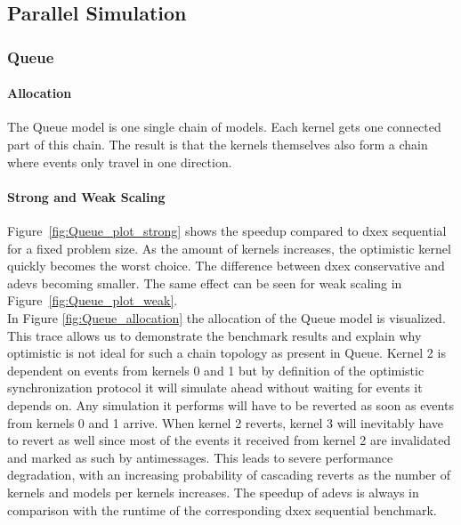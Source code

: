 \subsection{Parallel Simulation}

\subsubsection{Queue}
\paragraph*{Allocation}
The Queue model is one single chain of models. Each kernel gets one connected part of this chain. The result is that the kernels themselves also form a chain where events only travel in one direction.

\paragraph*{Strong and Weak Scaling}
Figure~\ref{fig:Queue_plot_strong} shows the speedup compared to dxex sequential for a fixed problem size. As the amount of kernels increases, the optimistic kernel quickly becomes the worst choice. The difference between dxex conservative and adevs becoming smaller. The same effect can be seen for weak scaling in Figure~\ref{fig:Queue_plot_weak}.\\
In Figure \ref{fig:Queue_allocation} the allocation of the Queue model is visualized. This trace allows us to demonstrate the benchmark results and explain why optimistic is not ideal for such a chain topology as present in Queue. Kernel 2 is dependent on events from kernels 0 and 1 but by definition of the optimistic synchronization protocol it will simulate ahead without waiting for events it depends on. Any simulation it performs will have to be reverted as soon as events from kernels 0 and 1 arrive. When kernel 2 reverts, kernel 3 will inevitably have to revert as well since most of the events it received from kernel 2 are invalidated and marked as such by antimessages. This leads to severe performance degradation, with an increasing probability of cascading reverts as the number of kernels and models per kernels increases.
The speedup of adevs is always in comparison with the runtime of the corresponding dxex sequential benchmark.
